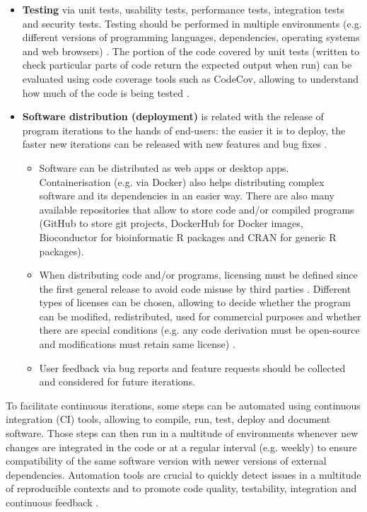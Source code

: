 \begin{itemize}
\begin{itemize}
	\end{itemize}
	\item{\textbf{Testing} via unit tests, usability tests, performance tests, integration tests and security tests. Testing should be performed in multiple environments (e.g. different versions of programming languages, dependencies, operating systems and web browsers) \cite{silva:2017wl,kanat-alexander:2012ve,ford:2021ub}. The portion of the code covered by unit tests (written to check particular parts of code return the expected output when run) can be evaluated using code coverage tools such as CodeCov, allowing to understand how much of the code is being tested \cite{hewitt:2019uj}.}
	\item \textbf{Software distribution (deployment)} is related with the release of program iterations to the hands of end-users: the easier it is to deploy, the faster new iterations can be released with new features and bug fixes \cite{ford:2021ub}.
	\begin{itemize}
		\item Software can be distributed as web apps or desktop apps. Containerisation (e.g. via Docker) also helps distributing complex software and its dependencies in an easier way. There are also many available repositories that allow to store code and/or compiled programs (GitHub to store git projects, DockerHub for Docker images, Bioconductor for bioinformatic R packages \cite{huber:2015wt} and CRAN for generic R packages).
		\item When distributing code and/or programs, licensing must be defined since the first general release to avoid code misuse by third parties \cite{silva:2017wl}. Different types of licenses can be chosen, allowing to decide whether the program can be modified, redistributed, used for commercial purposes and whether there are special conditions (e.g. any code derivation must be open-source and modifications must retain same license) \cite{silva:2017wl}.
		\item User feedback via bug reports and feature requests should be collected and considered for future  iterations.
	\end{itemize}
\end{itemize}

To facilitate continuous iterations, some steps can be automated using continuous integration (CI) tools, allowing to compile, run, test, deploy and document software. Those steps can then run in a multitude of environments whenever new changes are integrated in the code or at a regular interval (e.g. weekly) to ensure compatibility of the same software version with newer versions of external dependencies. Automation tools are crucial to quickly detect issues in a multitude of reproducible contexts and to promote code quality, testability, integration and continuous feedback \cite{silva:2017wl,hewitt:2019uj,ford:2021ub,storer:2017tr}.

